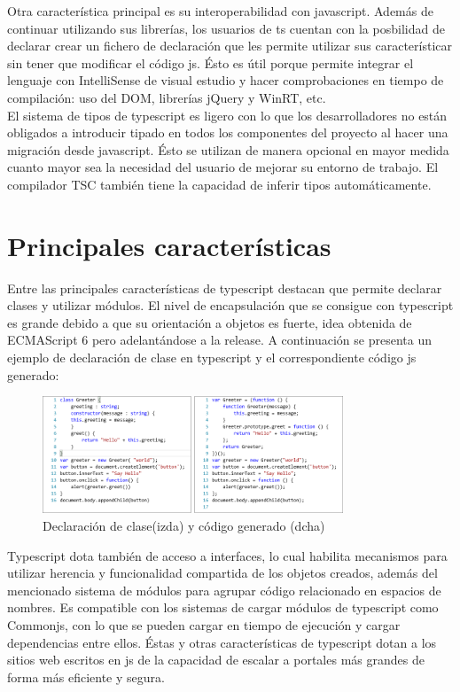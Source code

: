 \documentclass[12pt,twoside,a4paper, spanish]{article}
\begin{document}
	Otra característica principal es su interoperabilidad con javascript. Además de continuar utilizando sus librerías, los usuarios de ts cuentan con la posbilidad de declarar crear un fichero de declaración que les permite utilizar sus característicar sin tener que modificar el código js. Ésto es útil porque permite integrar el lenguaje con IntelliSense de visual estudio y hacer comprobaciones en tiempo de compilación: uso del DOM, librerías jQuery y WinRT, etc. \\
	
	El sistema de tipos de typescript es ligero con lo que los desarrolladores no están obligados a introducir tipado en todos los componentes del proyecto al hacer una migración desde javascript. Ésto se utilizan de manera opcional en mayor medida cuanto mayor sea la necesidad del usuario de mejorar su entorno de trabajo. El compilador TSC también tiene la capacidad de inferir tipos automáticamente.
    
    \section{Principales características}
    
    Entre las principales características de typescript destacan que permite declarar clases y utilizar módulos. El nivel de encapsulación que se consigue con typescript es grande debido a que su orientación a objetos es fuerte, idea obtenida de ECMAScript 6 pero adelantándose a la release. A continuación se presenta un ejemplo de declaración de clase en typescript y el correspondiente código js generado:
    
    \begin{figure}[h]
    	\centering
    	\includegraphics[width=0.8\textwidth]{imagenes/ts7.png}
    	\caption{Declaración de clase(izda) y código generado (dcha)}
    \end{figure}

	Typescript dota también de acceso a interfaces, lo cual habilita mecanismos para utilizar herencia y funcionalidad compartida de los objetos creados, además del mencionado sistema de módulos para agrupar código relacionado en espacios de nombres. Es compatible con los sistemas de cargar módulos de typescript como Commonjs, con lo que se pueden cargar en tiempo de ejecución y cargar dependencias entre ellos. Éstas y otras características de typescript dotan a los sitios web escritos en js de la capacidad de escalar a portales más grandes de forma más eficiente y segura.
    
\end{document}
